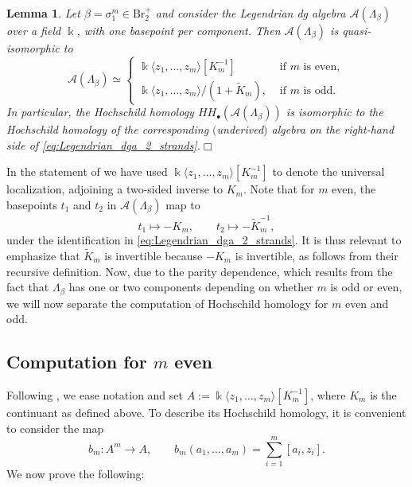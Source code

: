 \documentclass[11pt]{article}
\newtheorem{lemma}[theorem]{Lemma}
\newcommand{\kk}{\Bbbk}
\newcommand{\La}{\Lambda}
\newcommand{\SA}{\mathcal A}
\begin{document}
\begin{lemma}\label{lemma:Legendrian_dga_2_strands}
Let $\beta=\sigma_1^{m}\in\mbox{Br}^+_2$ and consider the Legendrian dg algebra $\SA(\La_\beta)$ over a field $\kk$, with one basepoint per component. Then $\SA(\La_\beta)$ is quasi-isomorphic to
\begin{equation}\label{eq:Legendrian_dga_2_strands}
\SA(\La_\beta)\simeq\begin{cases}
\kk\langle z_1,\ldots,z_m\rangle[K_m^{-1}] & \mbox{ if $m$ is even},\\
\kk\langle z_1,\ldots,z_m\rangle/(1+\widetilde K_m), & \mbox{ if $m$ is odd}.
\end{cases}
\end{equation}
In particular, the Hochschild homology $HH_\bullet(\SA(\La_\beta))$ is isomorphic to the Hochschild homology of the corresponding $($underived$)$ algebra on the right-hand side of \eqref{eq:Legendrian_dga_2_strands}.\hfill$\Box$
\end{lemma}

\noindent In the statement of  we have used $\kk\langle z_1,\ldots,z_m\rangle[K_m^{-1}]$ to denote the universal localization, adjoining a two-sided inverse to $K_m$. Note that for $m$ even, the basepoints $t_1$ and $t_2$ in $\SA(\La_\beta)$ map to
$$t_1\mapsto-K_m,\qquad t_2\mapsto-\widetilde K_m^{-1},$$
under the identification in \eqref{eq:Legendrian_dga_2_strands}. It is thus relevant to emphasize that $\widetilde K_m$ is invertible because $-K_m$ is invertible, as follows from their recursive definition. Now, due to the parity dependence, which results from the fact that $\La_\beta$ has one or two components depending on whether $m$ is odd or even, we will now separate the computation of Hochschild homology for $m$ even and odd.

\subsection{ Computation for $m$ even}\label{ssec:HH_m_even} Following , we ease notation and set $A:=\kk\langle z_1,\ldots,z_m\rangle[K_m^{-1}]$, where $K_m$ is the continuant as defined above. To describe its Hochschild homology, it is convenient to consider the map
\begin{equation}\label{eq:b_map}
 b_m:A^m\longrightarrow A,\qquad
 b_m(a_1,\ldots,a_m)=\sum_{i=1}^m[a_i,z_i].
\end{equation}
We now prove the following:
\end{document}
